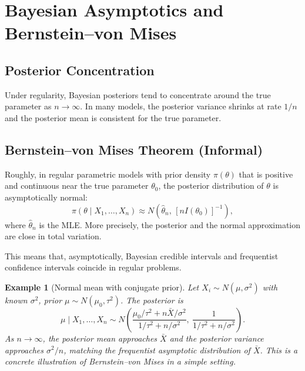 \documentclass[11pt,a4paper]{article}
\newtheorem{example}{Example}[section]
\numberwithin{equation}{section}
\begin{document}
\newpage

\section{Bayesian Asymptotics and Bernstein--von Mises}

\subsection{Posterior Concentration}

Under regularity, Bayesian posteriors tend to concentrate around the true parameter as $n\to\infty$. 
In many models, the posterior variance shrinks at rate $1/n$ and the posterior mean is consistent for the true parameter.

\subsection{Bernstein--von Mises Theorem (Informal)}

Roughly, in regular parametric models with prior density $\pi(\theta)$ that is positive and continuous near the true parameter $\theta_0$, the posterior distribution of $\theta$ is asymptotically normal:
\[
\pi(\theta \mid X_1,\dots,X_n)
\approx N\left(\hat{\theta}_n,\, [n I(\theta_0)]^{-1}\right),
\]
where $\hat{\theta}_n$ is the MLE. 
More precisely, the posterior and the normal approximation are close in total variation.

This means that, asymptotically, Bayesian credible intervals and frequentist confidence intervals coincide in regular problems.

\begin{example}[Normal mean with conjugate prior]
Let $X_i\sim N(\mu,\sigma^2)$ with known $\sigma^2$, prior $\mu \sim N(\mu_0,\tau^2)$. 
The posterior is
\[
\mu \mid X_1,\dots,X_n \sim
N\left(
\frac{\mu_0/\tau^2 + n\bar{X}/\sigma^2}{1/\tau^2 + n/\sigma^2},
\ \frac{1}{1/\tau^2 + n/\sigma^2}
\right).
\]
As $n\to\infty$, the posterior mean approaches $\bar{X}$ and the posterior variance approaches $\sigma^2/n$, matching the frequentist asymptotic distribution of $\bar{X}$. 
This is a concrete illustration of Bernstein--von Mises in a simple setting.

\end{example}

\newpage

\end{document}
